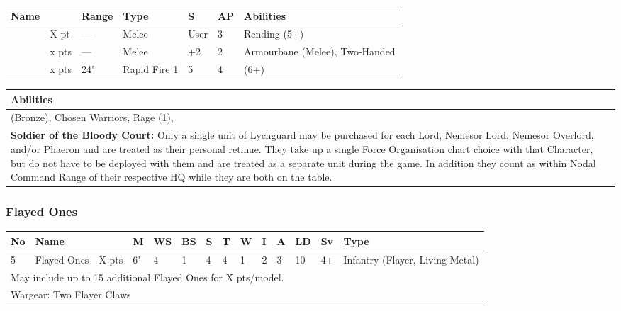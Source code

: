 \noindent
\begin{tabular}{||m{110pt} m{30pt} m{31pt} m{55pt} m{12pt} m{12pt} m{210pt}||}
	\hline
	Name & & Range & Type & S & AP & Abilities \\
	\hline
	\quickref{Hyperphase Sword} & X pt & — & Melee & User & 3 & Rending (5+) \\
	\quickref{Warscythe} & x pts& — & Melee & +2 & 2 & Armourbane (Melee), Two-Handed \\
	\quickref{Gauss Blaster} & x pts& 24" & Rapid Fire 1 & 5 & 4 & \quickref{Gauss} (6+) \\
	\hline
\end{tabular}

\noindent
\begin{tabular}{||m{532pt}||}
	\hline
	Abilities \\
	\hline
	\quickref{Awakening Protocols} (Bronze), Chosen Warriors, Rage (1), \quickref{Reanimation Protocols} \\
	\textbf{Soldier of the Bloody Court:} Only a single unit of Lychguard may be purchased for each Lord, Nemesor Lord, Nemesor Overlord, and/or Phaeron and are treated as their personal retinue. They take up a single Force Organisation chart choice with that Character, but do not have to be deployed with them and are treated as a separate unit during the game. In addition they count as within Nodal Command Range of their respective HQ while they are both on the table. \\
	\hline
\end{tabular}



\newpage
\subsubsection{Flayed Ones}

\noindent
\begin{tabular}{||m{10pt} m{90pt} m{30pt} m{11pt} m{11pt} m{11pt} m{11pt} m{11pt} m{11pt} m{11pt} m{11pt} m{11pt} m{11pt} m{135pt}||}
	\hline
	No & Name & & M & WS & BS & S & T & W & I & A & LD & Sv & Type \\
	\hline
	5 & Flayed Ones & X pts & 6" & 4 & 1 & 4 & 4 & 1 & 2 & 3 & 10 & 4+ & Infantry (Flayer, Living Metal) \\
	\hline
	\hline
	\multicolumn{14}{||Z{532 pt}||}{May include up to 15 additional Flayed Ones for X pts/model.}\\	
	\hline
	\hline
	\multicolumn{14}{||Z{532 pt}||}{Wargear: Two Flayer Claws}\\
	\hline
\end{tabular}

